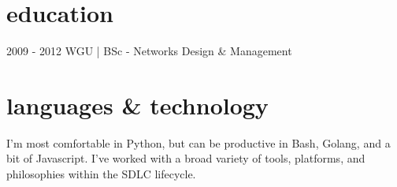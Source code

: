 \documentclass[]{mv_cv}
\begin{document}
\section{education}
\begin{content}
  {2009 - 2012 WGU | BSc - Networks Design \& Management}
\end{content}

\section{languages \& technology}
\begin{content}
  {I'm most comfortable in Python, but can be productive in Bash, Golang, and a bit of Javascript. I've worked with a broad variety of tools, platforms, and philosophies within the SDLC lifecycle.}
\end{content}

\thispagestyle{empty}
\end{document}
